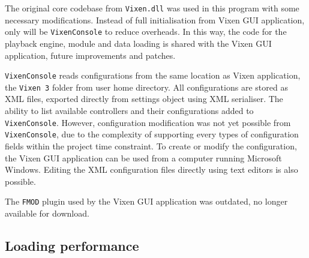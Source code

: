 
The original core codebase from \texttt{Vixen.dll} was used in this program with some necessary modifications. Instead of full initialisation from Vixen GUI application, only  will be  \texttt{VixenConsole} to reduce overheads. In this way, the code for the playback engine, module and data loading is  shared with the Vixen GUI application,  future improvements and patches.

\texttt{VixenConsole} reads configurations from the same location as Vixen application, the \texttt{Vixen 3} folder from user home directory. All configurations are stored as XML files, exported directly from settings object using XML serialiser. The ability to list available controllers and their configurations  added to \texttt{VixenConsole}. However, configuration modification was not yet possible from \texttt{VixenConsole}, due to the complexity of supporting every  types of configuration fields within the project time constraint. To create or modify the configuration, the Vixen GUI application can be used from a computer running Microsoft Windows. Editing the XML configuration files directly using text editors is also possible.

The \texttt{FMOD} plugin used by the Vixen GUI application was outdated,  no longer available for download.



\subsection{Loading performance}

